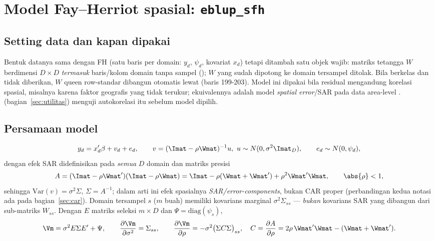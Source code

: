 \section{Model Fay--Herriot spasial: \texttt{eblup\_sfh}}\label{sec:sfh}

\subsection{Setting data dan kapan dipakai}\label{sec:sfh-setting}

Bentuk datanya sama dengan FH (satu baris per domain: $y_d$, $\psi_d$, kovariat
$x_d$) tetapi ditambah satu objek wajib: matriks tetangga $W$ berdimensi
$D\times D$ \emph{termasuk} baris/kolom domain tanpa sampel
(); $W$ yang sudah dipotong ke domain tersampel
ditolak. Bila  berkelas  dan  tidak diberikan,
$W$ queen row-standar dibangun otomatis lewat 
(baris 199-203). Model ini dipakai bila residual mengandung korelasi spasial,
misalnya karena faktor geografis yang tidak terukur; ekuivalennya adalah model
\emph{spatial error}/SAR pada data area-level
\citep{pratesi2008small, rao2015small}. 
(bagian~\ref{sec:utilitas}) menguji autokorelasi itu sebelum model dipilih.

\subsection{Persamaan model}\label{sec:sfh-model}

\begin{equation}
  y_d=x_d'\beta+v_d+e_d,\qquad
  v=(\Imat-\rho \Wmat)^{-1}u,\ u\sim N(0,\sigma^2\Imat_D),\qquad
  e_d\sim N(0,\psi_d),
  \label{eq:sfh-model}
\end{equation}
dengan efek SAR didefinisikan pada \emph{semua} $D$ domain dan matriks presisi
\begin{equation}
  A=(\Imat-\rho \Wmat')(\Imat-\rho \Wmat)
   =\Imat-\rho(\Wmat+\Wmat')+\rho^2\Wmat'\Wmat,
  \qquad \abs{\rho}<1,
  \label{eq:sfh-A}
\end{equation}
sehingga $\mathrm{Var}(v)=\sigma^2\Sigma$, $\Sigma=A^{-1}$; dalam arti ini efek
spasialnya \emph{SAR/error-components}, bukan CAR proper (perbandingan kedua
notasi ada pada bagian~\ref{sec:car}). Domain tersampel $s$ ($m$ buah) memiliki
kovarians marginal $\sigma^2\Sigma_{ss}$ --- \emph{bukan} kovarians SAR yang
dibangun dari sub-matriks $W_{ss}$. Dengan $E$ matriks seleksi $m\times D$ dan
$\Psi=\mathrm{diag}(\psi_s)$,
\begin{equation}
  \Vm=\sigma^2E\Sigma E'+\Psi,\qquad
  \frac{\partial \Vm}{\partial\sigma^2}=\Sigma_{ss},\qquad
  \frac{\partial \Vm}{\partial\rho}=-\sigma^2\bigl(\Sigma C\Sigma\bigr)_{ss},\quad
  C=\frac{\partial A}{\partial\rho}=2\rho\,\Wmat'\Wmat-(\Wmat+\Wmat').
  \label{eq:sfh-deriv}
\end{equation}

